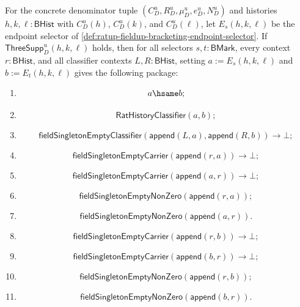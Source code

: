 \begin{theorem}
\label{thm:ratup-fieldup-bracketing-selector-independence-package}
For the concrete denominator tuple $(C_D^u,R_D^u,\mu_D^u,e_D^u,N_D^u)$ and
histories $h,k,\ell:\mathsf{BHist}$ with $C_D^u(h)$, $C_D^u(k)$, and
$C_D^u(\ell)$, let $E_s(h,k,\ell)$ be the endpoint selector of
\autoref{def:ratup-fieldup-bracketing-endpoint-selector}. If
$\mathsf{ThreeSupp}_D^u(h,k,\ell)$ holds, then for all selectors
$s,t:\mathsf{BMark}$, every context $r:\mathsf{BHist}$, and all classifier
contexts $L,R:\mathsf{BHist}$, setting
$a:=E_s(h,k,\ell)$ and $b:=E_t(h,k,\ell)$ gives the following package:
\begin{enumerate}
  \item
  $$
  a\hsame b;
  $$
  \item
  $$
  \mathsf{RatHistoryClassifier}(a,b);
  $$
  \item
  $$
  \mathsf{fieldSingletonEmptyClassifier}(\mathsf{append}(L,a),\mathsf{append}(R,b))\to\bot;
  $$
  \item
  $$
  \mathsf{fieldSingletonEmptyCarrier}(\mathsf{append}(r,a))\to\bot;
  $$
  \item
  $$
  \mathsf{fieldSingletonEmptyCarrier}(\mathsf{append}(a,r))\to\bot;
  $$
  \item
  $$
  \mathsf{fieldSingletonEmptyNonZero}(\mathsf{append}(r,a));
  $$
  \item
  $$
  \mathsf{fieldSingletonEmptyNonZero}(\mathsf{append}(a,r)).
  $$
  \item
  $$
  \mathsf{fieldSingletonEmptyCarrier}(\mathsf{append}(r,b))\to\bot;
  $$
  \item
  $$
  \mathsf{fieldSingletonEmptyCarrier}(\mathsf{append}(b,r))\to\bot;
  $$
  \item
  $$
  \mathsf{fieldSingletonEmptyNonZero}(\mathsf{append}(r,b));
  $$
  \item
  $$
  \mathsf{fieldSingletonEmptyNonZero}(\mathsf{append}(b,r)).
  $$
\end{enumerate}
\end{theorem}
